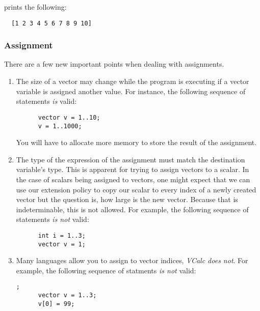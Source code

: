 \documentclass{article}
\begin{document}
prints the following:
\begin{lstlisting}
  [1 2 3 4 5 6 7 8 9 10]
\end{lstlisting}

\subsubsection{Assignment}
There are a few new important points when dealing with assignments.
\begin{enumerate}
  \item
    The size of a vector may change while the program is executing if a vector variable is assigned
    another value. For instance, the following sequence of statements \textit{is} valid:
    \begin{lstlisting}
      vector v = 1..10;
      v = 1..1000;
    \end{lstlisting}
    You will have to allocate more memory to store the result of the assignment.
  \item
    The type of the expression of the assignment must match the destination variable's type. This
    is apparent for trying to assign vectors to a scalar. In the case of scalars being assigned to
    vectors, one might expect that we can use our extension policy to copy our scalar to every index
    of a newly created vector but the question is, how large is the new vector. Because that is
    indeterminable, this is not allowed. For example, the following sequence of statements
    \textit{is not} valid:
    \begin{lstlisting}
      int i = 1..3;
      vector v = 1;
    \end{lstlisting}
  \item
    Many languages allow you to assign to vector indices, \textit{VCalc does not}. For example, the
    following sequence of statments \textit{is not} valid:
    \begin{lstlisting};
      vector v = 1..3;
      v[0] = 99;
    \end{lstlisting}
\end{enumerate}
\end{document}
